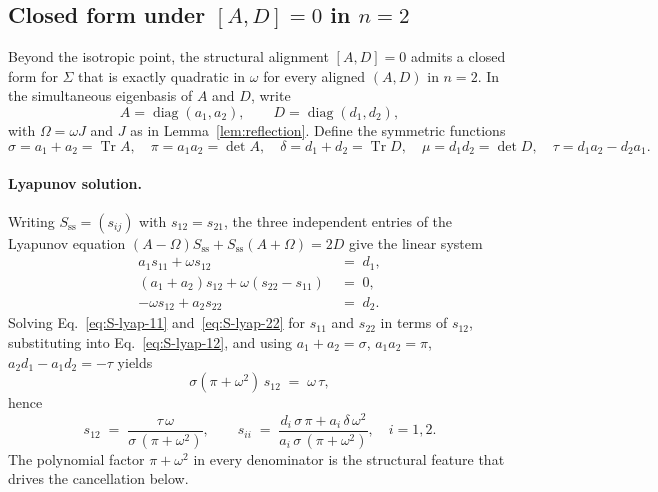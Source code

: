 \documentclass[%
 reprint,
 superscriptaddress,
 nofootinbib,
 nobibnotes,
 amsmath,amssymb,
 aps,
 prl,
 floatfix,
]{revtex4-2}
\newcommand{\Sss}{S_{\mathrm{ss}}}
\newcommand{\Tr}{\operatorname{Tr}}
\DeclareMathOperator{\diag}{diag}
\begin{document}
\subsection{Closed form under $[A,D]=0$ in $n=2$}\label{app:sigma-aligned}

Beyond the isotropic point, the structural alignment $[A,D]=0$ admits a closed form for $\Sigma$ that is exactly quadratic in $\omega$ for every aligned $(A,D)$ in $n=2$. In the simultaneous eigenbasis of $A$ and $D$, write
\[
A = \diag(a_1, a_2), \qquad D = \diag(d_1, d_2),
\]
with $\Omega = \omega J$ and $J$ as in Lemma~\ref{lem:reflection}. Define the symmetric functions
\begin{equation}\label{eq:S-aligned-symfuncs}
\sigma = a_1 + a_2 = \Tr A, \quad \pi = a_1 a_2 = \det A, \quad \delta = d_1 + d_2 = \Tr D, \quad \mu = d_1 d_2 = \det D, \quad \tau = d_1 a_2 - d_2 a_1.
\end{equation}

\paragraph{Lyapunov solution.}
Writing $\Sss = (s_{ij})$ with $s_{12} = s_{21}$, the three independent entries of the Lyapunov equation $(A - \Omega) \Sss + \Sss (A + \Omega) = 2D$ give the linear system
\begin{subequations}\label{eq:S-lyap-components}
\begin{align}
a_1 s_{11} + \omega s_{12} &\;=\; d_1, \label{eq:S-lyap-11}\\
(a_1 + a_2) s_{12} + \omega(s_{22} - s_{11}) &\;=\; 0, \label{eq:S-lyap-12}\\
- \omega s_{12} + a_2 s_{22} &\;=\; d_2. \label{eq:S-lyap-22}
\end{align}
\end{subequations}
Solving Eq.~\eqref{eq:S-lyap-11} and~\eqref{eq:S-lyap-22} for $s_{11}$ and $s_{22}$ in terms of $s_{12}$, substituting into Eq.~\eqref{eq:S-lyap-12}, and using $a_1 + a_2 = \sigma$, $a_1 a_2 = \pi$, $a_2 d_1 - a_1 d_2 = -\tau$ yields
\[
\sigma(\pi + \omega^2)\,s_{12} \;=\; \omega\,\tau,
\]
hence
\begin{equation}\label{eq:S-Sss-aligned}
s_{12} \;=\; \frac{\tau\,\omega}{\sigma\,(\pi+\omega^2)}, \qquad
s_{ii} \;=\; \frac{d_i\,\sigma\,\pi + a_i\,\delta\,\omega^2}{a_i\,\sigma\,(\pi+\omega^2)}, \quad i = 1, 2.
\end{equation}
The polynomial factor $\pi + \omega^2$ in every denominator is the structural feature that drives the cancellation below.
\end{document}
